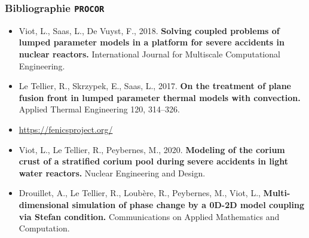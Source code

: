 \documentclass{beamer}
\newcommand{\procor}{\texttt{PROCOR}}
\begin{document}

\begin{frame}
    \frametitle{Bibliographie \procor{}}
	\footnotesize

\begin{itemize}
	\item Viot, L., Saas, L., De Vuyst, F., 2018. \textbf{Solving coupled problems of lumped parameter models in a platform for severe accidents in nuclear reactors.} International Journal for Multiscale Computational Engineering.
	\item Le Tellier, R., Skrzypek, E., Saas, L., 2017. \textbf{On the treatment of plane fusion front in lumped parameter thermal models with convection.} Applied Thermal Engineering 120, 314–326. 
	\item \url{https://fenicsproject.org/} 
	\item Viot, L., Le Tellier, R., Peybernes, M., 2020. \textbf{Modeling of the corium crust of a stratified corium pool during severe accidents in light water reactors.} Nuclear Engineering and Design.
	\item \color{blue} Drouillet, A., Le Tellier, R., Loubère, R., Peybernes, M., Viot, L., \textbf{Multi-dimensional simulation of phase change by a 0D-2D model coupling via Stefan condition.} Communications on Applied Mathematics and Computation.





\end{itemize}


\end{frame}
\end{document}
